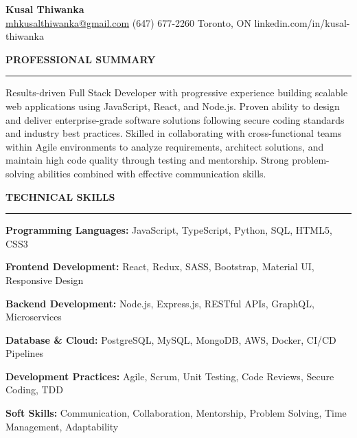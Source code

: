 \documentclass[10pt,letterpaper]{article}
\begin{document}
\begin{center}
{\LARGE\textbf{Kusal Thiwanka}}\\[3pt]
\href{mailto:mhkusalthiwanka@gmail.com}{mhkusalthiwanka@gmail.com}\hspace{2em}%
(647) 677{-}2260\hspace{2em}%
Toronto, ON\hspace{2em}
linkedin.com/in/kusal-thiwanka
\end{center}

\vspace{6pt}

\textbf{PROFESSIONAL SUMMARY}\\[-8pt]
\noindent\rule{\textwidth}{1pt}

\vspace{-2pt}

Results-driven Full Stack Developer with progressive experience building scalable web applications using JavaScript, React, and Node.js. Proven ability to design and deliver enterprise-grade software solutions following secure coding standards and industry best practices. Skilled in collaborating with cross-functional teams within Agile environments to analyze requirements, architect solutions, and maintain high code quality through testing and mentorship. Strong problem-solving abilities combined with effective communication skills.

\vspace{8pt}

\textbf{TECHNICAL SKILLS}\\[-8pt]
\noindent\rule{\textwidth}{1pt}

\vspace{-2pt}

\textbf{Programming Languages:} JavaScript, TypeScript, Python, SQL, HTML5, CSS3

\textbf{Frontend Development:} React, Redux, SASS, Bootstrap, Material UI, Responsive Design

\textbf{Backend Development:} Node.js, Express.js, RESTful APIs, GraphQL, Microservices

\textbf{Database \& Cloud:} PostgreSQL, MySQL, MongoDB, AWS, Docker, CI/CD Pipelines

\textbf{Development Practices:} Agile, Scrum, Unit Testing, Code Reviews, Secure Coding, TDD

\textbf{Soft Skills:} Communication, Collaboration, Mentorship, Problem Solving, Time Management, Adaptability

\vspace{8pt}
\end{document}
